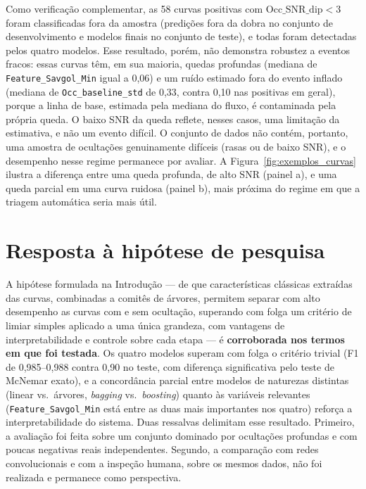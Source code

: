 Como verificação complementar, as 58 curvas positivas com $\mathrm{Occ\_SNR\_dip} < 3$ foram classificadas fora da amostra (predições fora da dobra no conjunto de desenvolvimento e modelos finais no conjunto de teste), e todas foram detectadas pelos quatro modelos. Esse resultado, porém, não demonstra robustez a eventos fracos: essas curvas têm, em sua maioria, quedas profundas (mediana de \texttt{Feature\_Savgol\_Min} igual a 0,06) e um ruído estimado fora do evento inflado (mediana de \texttt{Occ\_baseline\_std} de 0,33, contra 0,10 nas positivas em geral), porque a linha de base, estimada pela mediana do fluxo, é contaminada pela própria queda. O baixo SNR da queda reflete, nesses casos, uma limitação da estimativa, e não um evento difícil. O conjunto de dados não contém, portanto, uma amostra de ocultações genuinamente difíceis (rasas ou de baixo SNR), e o desempenho nesse regime permanece por avaliar. A Figura~\ref{fig:exemplos_curvas} ilustra a diferença entre uma queda profunda, de alto SNR (painel a), e uma queda parcial em uma curva ruidosa (painel b), mais próxima do regime em que a triagem automática seria mais útil.

\section{Resposta à hipótese de pesquisa}

A hipótese formulada na Introdução --- de que características clássicas extraídas das curvas, combinadas a comitês de árvores, permitem separar com alto desempenho as curvas com e sem ocultação, superando com folga um critério de limiar simples aplicado a uma única grandeza, com vantagens de interpretabilidade e controle sobre cada etapa --- é \textbf{corroborada nos termos em que foi testada}. Os quatro modelos superam com folga o critério trivial (F1 de 0,985--0,988 contra 0,90 no teste, com diferença significativa pelo teste de McNemar exato), e a concordância parcial entre modelos de naturezas distintas (linear vs.\ árvores, \textit{bagging} vs.\ \textit{boosting}) quanto às variáveis relevantes (\texttt{Feature\_Savgol\_Min} está entre as duas mais importantes nos quatro) reforça a interpretabilidade do sistema. Duas ressalvas delimitam esse resultado. Primeiro, a avaliação foi feita sobre um conjunto dominado por ocultações profundas e com poucas negativas reais independentes. Segundo, a comparação com redes convolucionais e com a inspeção humana, sobre os mesmos dados, não foi realizada e permanece como perspectiva.

